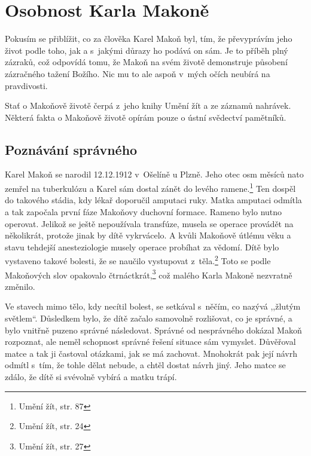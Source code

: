 \chapter{Osobnost Karla Makoně}


Pokusím se přiblížit, co za člověka Karel Makoň byl, tím, že převyprávím jeho
život podle toho, jak a s~jakými důrazy ho podává on sám. Je to příběh plný
zázraků, což odpovídá tomu, že Makoň na svém životě demonstruje působení
zázračného tažení Božího. Nic mu to ale aspoň v~mých očích neubírá na
pravdivosti.

Stať o Makoňově životě čerpá z~jeho knihy Umění žít\cite{KaMaUZ} a ze záznamů nahrávek.
Některá fakta o Makoňově životě opírám pouze o ústní svědectví pamětníků.

\section{Poznávání správného}

Karel Makoň se narodil 12.12.1912 v~Ošelíně u Plzně. Jeho otec osm měsíců
nato zemřel na tuberkulózu a Karel sám dostal zánět do levého ramene.\footnote{Umění žít, str. 87} Ten dospěl
do takového stádia, kdy lékař doporučil amputaci ruky. Matka amputaci odmítla a tak
započala první fáze Makoňovy duchovní formace. Rameno bylo nutno operovat.
Jelikož se ještě nepoužívala transfúze, musela se operace provádět na
několikrát, protože jinak by dítě vykrvácelo. A kvůli Makoňově útlému věku a
stavu tehdejší anesteziologie musely operace probíhat za vědomí. Dítě bylo
vystaveno takové bolesti, že se naučilo vystupovat z~těla.\footnote{Umění žít,
str. 24} Toto se podle
Makoňových slov opakovalo čtrnáctkrát,\footnote{Umění žít, str. 27} což malého Karla Makoně nezvratně
změnilo.

Ve stavech mimo tělo, kdy necítil bolest, se setkával s~něčím, co nazývá
,,žlutým světlem``.  Důsledkem bylo, že dítě začalo samovolně rozlišovat, co je
  správné, a bylo vnitřně puzeno správné následovat. Správné od nesprávného dokázal
Makoň rozpoznat, ale neměl schopnost správné řešení situace sám
vymyslet. Důvěřoval
matce a tak ji častoval otázkami, jak se má zachovat. Mnohokrát pak její návrh
odmítl s~tím, že tohle dělat nebude, a chtěl dostat návrh jiný. Jeho
matce se zdálo, že dítě si svévolně vybírá a matku trápí.

